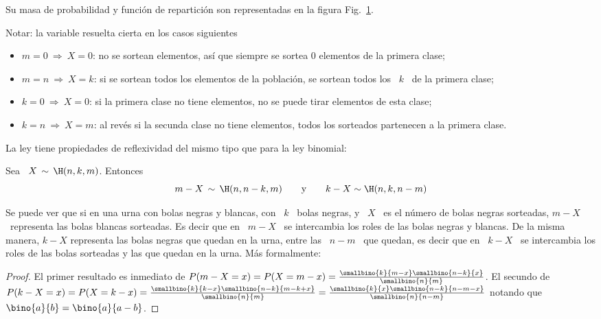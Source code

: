Su masa  de probabilidad  y funci\'on de  repartici\'on son representadas  en la
figura Fig.~\ref{Fig:MP:Hipergeometrica}.
%
\begin{figure}[h!]
\begin{center}  \end{center}
%
\label{Fig:MP:Hipergeometrica}
\end{figure}


Notar: la variable resuelta cierta en los casos siguientes
%
\begin{itemize}
\item  $m = 0  \: \Rightarrow  \: X  = 0$:  no se  sortean elementos,  as\'i que
  siempre se sortea $0$ elementos de la primera clase;
%
\item $m =  n \: \Rightarrow \: X =  k$: si se sortean todos los  elementos de la
  poblaci\'on, se sortean todos los \ $k$ \ de la primera clase;
%
\item $k = 0 \: \Rightarrow \: X = 0$: si la primera clase no tiene elementos, no
  se puede tirar elementos de esta clase;
%
\item $k = n  \: \Rightarrow \: X = m$: al rev\'es si  la secunda clase no tiene
  elementos, todos los sorteados partenecen a la primera clase.
\end{itemize}

La ley tiene propiedades de reflexividad del mismo tipo que para la ley binomial:
%
\begin{lema}[Reflexividad]
\label{Lem:MP:ReflexividadHipergeometrica}
%
  Sea \ $X \, \sim \, \H(n,k,m)$. Entonces
  \[
  m-X \, \sim \, \H(n,n-k,m) \qquad \mbox{y} \qquad k-X \sim \H(n,k,n-m)
  \]
\end{lema}
%
Se puede ver  que si en una urna con  bolas negras y blancas, con  \ $k$ \ bolas
negras, y \ $X$  \ es el n\'umero de bolas negras  sorteadas, $m-X$ \ representa
las bolas blancas sorteadas. Es decir que  en \ $m-X$ \ se intercambia los roles
de las bolas  negras y blancas.  De la misma manera,  $k-X$ representa las bolas
negras que quedan en la urna, entre las  \ $n-m$ \ que quedan, es decir que en \
$k-X$ \ se intercambia  los roles de las bolas sorteadas y  las que quedan en la
urna. M\'as formalmente:
%
\begin{proof}
  El  primer   resultado  es  inmediato  de  $P(m-X   =  x)  =  P(X   =  m-x)  =
  \frac{\smallbino{k}{m-x} \smallbino{n-k}{x}}{\smallbino{n}{m}}$. El secundo de
  $P(k-X    =     x)    =     P(X    =    k-x)     =    \frac{\smallbino{k}{k-x}
    \smallbino{n-k}{m-k+x}}{\smallbino{n}{m}}      =      \frac{\smallbino{k}{x}
    \smallbino{n-k}{n-m-x}}{\smallbino{n}{n-m}}$  notando   que  $\bino{a}{b}  =
  \bino{a}{a-b}$.
\end{proof}

